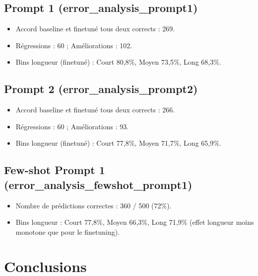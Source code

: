 \documentclass[11pt,a4paper]{article}
\begin{document}
\subsection{Prompt 1 (error\_analysis\_prompt1)}
\begin{itemize}
  \item Accord baseline et finetuné tous deux corrects : 269.
  \item Régressions : 60 ; Améliorations : 102.
  \item Bins longueur (finetuné) : Court 80,8\%, Moyen 73,5\%, Long 68,3\%.
\end{itemize}

\subsection{Prompt 2 (error\_analysis\_prompt2)}
\begin{itemize}
  \item Accord baseline et finetuné tous deux corrects : 266.
  \item Régressions : 60 ; Améliorations : 93.
  \item Bins longueur (finetuné) : Court 77,8\%, Moyen 71,7\%, Long 65,9\%.
\end{itemize}

\subsection{Few-shot Prompt 1 (error\_analysis\_fewshot\_prompt1)}
\begin{itemize}
  \item Nombre de prédictions correctes : 360 / 500 (72\%).
  \item Bins longueur : Court 77,8\%, Moyen 66,3\%, Long 71,9\% (effet longueur moins monotone que pour le finetuning).
\end{itemize}

\section{Conclusions}
\end{document}
